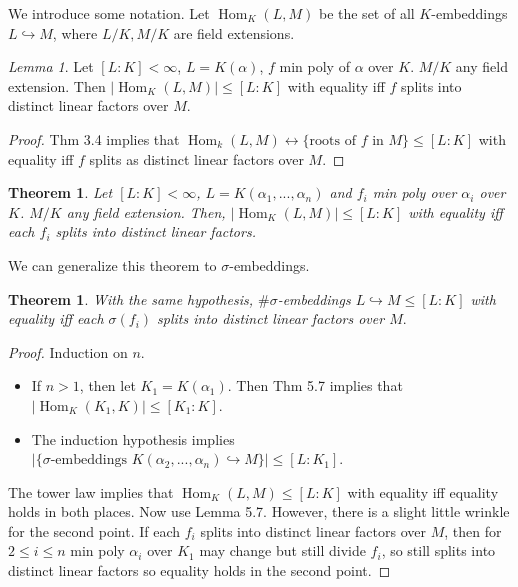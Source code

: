 \documentclass{article}
\theoremstyle{definition}
\theoremstyle{remark}
\newtheorem{lem}[defn]{Lemma}
\theoremstyle{plain}
\newtheorem{thm}[defn]{Theorem}
\newtheorem*{thm*}{Theorem}
\newcommand{\Hom}{\operatorname{Hom}}
\begin{document}
We introduce some notation. Let $\Hom_K(L,M)$ be the set of all $K$-embeddings $L\hookrightarrow M$, where $L/K, M/K$ are field extensions.

\begin{lem}
    Let $[L:K]<\infty$, $L=K(\alpha)$, $f$ min poly of $\alpha$ over $K$. $M/K$ any field extension. Then $|\Hom_K(L,M)|\le [L:K]$ with equality iff $f$ splits into distinct linear factors over $M$.
\end{lem}
\begin{proof}
    Thm 3.4 implies that $\Hom_k(L,M)\leftrightarrow\{\text{roots of }f\text{ in }M\}\le[L:K]$ with equality iff $f$ splits as distinct linear factors over $M$.
\end{proof}
\begin{thm}
    Let $[L:K]<\infty$, $L=K(\alpha_1,...,\alpha_n)$ and $f_i$ min poly over $\alpha_i$ over $K$. $M/K$ any field extension. Then, $|\Hom_K(L,M)|\le[L:K]$ with equality iff each $f_i$ splits into distinct linear factors.
\end{thm}
We can generalize this theorem to $\sigma$-embeddings.
\begin{thm*}
    With the same hypothesis, $\#\sigma$-embeddings $L\hookrightarrow M\le [L:K]$ with equality iff each $\sigma(f_i)$ splits into distinct linear factors over $M.$
\end{thm*}
\begin{proof}
    Induction on $n$. 
    \begin{itemize}
        \item If $n>1$, then let $K_1=K(\alpha_1)$. Then Thm 5.7 implies that $|\Hom_K(K_1,K)|\le[K_1:K]$.
        \item The induction hypothesis implies $|\{\sigma\text{-embeddings }K(\alpha_2,...,\alpha_n)\hookrightarrow M\}|\le[L:K_1]$.
    \end{itemize}
    The tower law implies that $\Hom_K(L,M)\le [L:K]$ with equality iff equality holds in both places. Now use Lemma 5.7. 
    However, there is a slight little wrinkle for the second point. If each $f_i$ splits into distinct linear factors over $M$, then for $2\le i\le n$ min poly $\alpha_i$ over $K_1$ may change but still divide $f_i$, so still splits into distinct linear factors so equality holds in the second point.
\end{proof}
\end{document}
